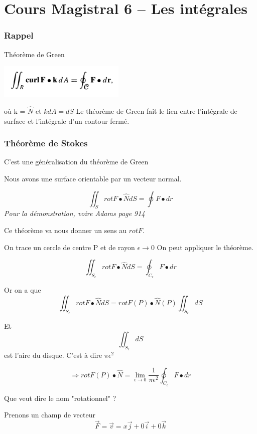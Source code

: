\part{Cours Magistral 6 -- Les intégrales}
\section{Rappel}

Théorème de Green

\begin{center}
\includegraphics[scale=0.7]{image1.png}\\
\end{center}

où k = $\hat N$ et $kdA = dS$
Le théorème de Green fait le lien entre l'intégrale de surface et l'intégrale d'un contour fermé.


\section{Théorème de Stokes}

C'est une généralisation du théorème de Green

Nous avons une surface orientable par un vecteur normal.

\[\iint_S rot F\bullet \hat N dS = \oint F\bullet dr\]
\textit{Pour la démonstration, voire Adams page 914}

Ce théorème va nous donner un sens au $rot F$.

On trace un cercle de centre P et de rayon $\epsilon \to 0$ On peut appliquer le théorème.

\[\iint_{S_{\epsilon}} rot F\bullet \hat N dS = \oint_{C_{\epsilon}} F\bullet dr\]

Or on a que
\[\iint_{S_{\epsilon}} rot F\bullet \hat N dS = rot F (P) \bullet \hat N (P) \iint_{S_{\epsilon}} dS\]

Et \[\iint_{S_{\epsilon}} dS\] est l'aire du disque. C'est à dire $\pi \epsilon ^2$

\[\Rightarrow rot F(P) \bullet \hat N = \lim_{\epsilon \to 0 }\frac{1}{\pi \epsilon ^2} \oint_{C_{\epsilon}}F\bullet dr\]

Que veut dire le nom "rotationnel" ?

Prenons un champ de vecteur
\[\vec F = \vec v = x \vec j +0 \vec i +0 \vec k\]

